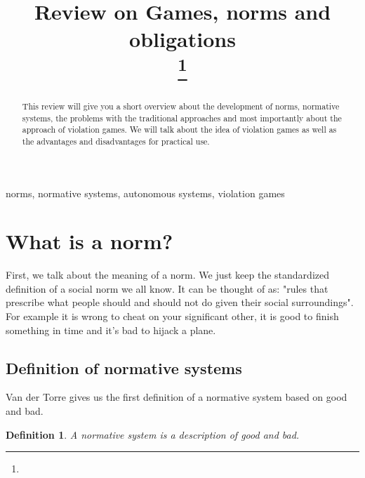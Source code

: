 \documentclass[conference]{hehe}
\newtheorem{definition}{Definition}
\begin{document}
\title{Review on Games, norms and obligations
\\
{\footnotesize \textsuperscript{}}
\thanks{}
}

\author{
\and
{}

}

\maketitle

\begin{abstract}
This review will give you a short overview about the development of norms, normative systems, the problems with the traditional approaches and most importantly about the approach of violation games. We will talk about the idea of violation games as well as the advantages and disadvantages for practical use.
\end{abstract}

\begin{IEEEkeywords}
norms, normative systems, autonomous systems, violation games
\end{IEEEkeywords}



\section{What is a norm?}

First, we talk about the meaning of a norm. We just keep the standardized definition of a social norm we all know. It can be thought of as: "rules that prescribe what people should and should not do given their social surroundings"\cite{b1}. For example it is wrong to cheat on your significant other, it is good to finish something in time and it's bad to hijack a plane.
\subsection{Definition of normative systems}
Van der Torre gives us the first definition of a normative system based on good and bad.\\

\begin{definition}
A normative system is a description of good and
bad. \cite{b2}
\end{definition}
\end{document}
